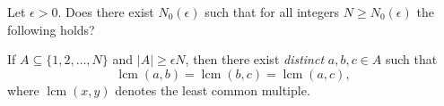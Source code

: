 Let $\epsilon>0$. Does there exist $N_0(\epsilon)$ such that for all integers $N\ge N_0(\epsilon)$ the following holds?

If $A\subseteq \{1,2,\dots,N\}$ and $|A|\ge \epsilon N$, then there exist \emph{distinct} $a,b,c\in A$ such that
\[
\operatorname{lcm}(a,b)=\operatorname{lcm}(b,c)=\operatorname{lcm}(a,c),
\]
where $\operatorname{lcm}(x,y)$ denotes the least common multiple.
